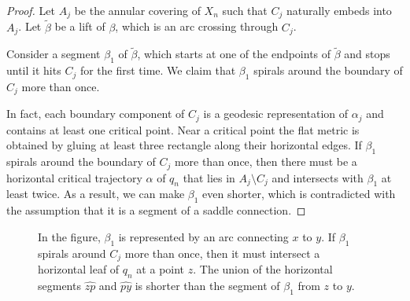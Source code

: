 \documentclass{amsart}
\theoremstyle{plain}
\theoremstyle{definition}
\numberwithin{equation}{section}
\begin{document}
\begin{proof}
Let $A_j$  be the annular covering  of $ X_n$
such that $C_j$ naturally embeds into  $A_j$.
Let $\tilde{\beta}$ be a lift of $\beta$, which is an arc crossing through 
 $C_j$.
 
Consider a segment $\beta_1$ of  $\tilde{\beta}$,
which starts at one of the endpoints of $\tilde{\beta}$  and stops until it
hits $C_j$ for the first time.  We claim that $\beta_1$ spirals around the boundary of $C_j$ more than once.

 In fact, each boundary component of $C_j$ is a geodesic representation of $\alpha_j$ and contains at least one critical point. 
Near a critical point the flat metric is obtained by gluing  at least 
 three rectangle along their horizontal edges. If $\beta_1$ spirals around the boundary of $C_j$ more than once, then there must be a horizontal critical trajectory $\alpha$ of $q_n$ that lies in $A_j\setminus C_j$ 
 and intersects with $\beta_1$ at least twice. 
As a result,  we can make $\beta_1$ even shorter, which is contradicted with the assumption that it is a segment of a saddle connection. 

\end{proof}

\begin{figure}[htb]
	\caption{In the figure, $\beta_1$ is represented by an arc connecting $x$ to $y$. If $\beta_1$ spirals around $C_j$ more than once, then it must intersect a horizontal leaf of $q_n$ at a point $z$. The union of the horizontal segments
$\widehat{zp}$ and $\widehat{py}$ is shorter than the segment of $\beta_1$ from $z$ to $y$.} 
	\label{fig_04}
\end{figure}
\end{document}
